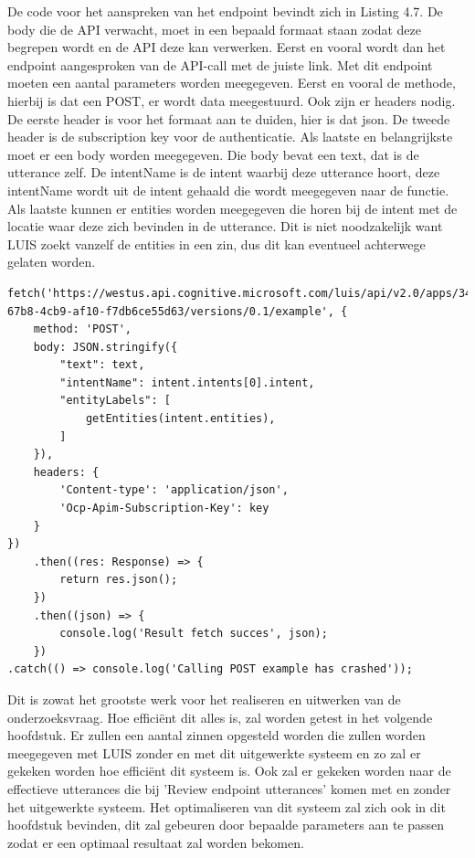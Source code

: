 De code voor het aanspreken van het endpoint bevindt zich in Listing 4.7. De body die de API verwacht, moet in een bepaald formaat staan zodat deze begrepen wordt en de API deze kan verwerken. Eerst en vooral wordt dan het endpoint aangesproken van de API-call met de juiste link. Met dit endpoint moeten een aantal parameters worden meegegeven. Eerst en vooral de methode, hierbij is dat een POST, er wordt data meegestuurd. Ook zijn er headers nodig. De eerste header is voor het formaat aan te duiden, hier is dat json. De tweede header is de subscription key voor de authenticatie. Als laatste en belangrijkste moet er een body worden meegegeven. Die body bevat een text, dat is de utterance zelf. De intentName is de intent waarbij deze utterance hoort, deze intentName wordt uit de intent gehaald die wordt meegegeven naar de functie. Als laatste kunnen er entities worden meegegeven die horen bij de intent met de locatie waar deze zich bevinden in de utterance. Dit is niet noodzakelijk want LUIS zoekt vanzelf de entities in een zin, dus dit kan eventueel achterwege gelaten worden.

\medskip
\begin{lstlisting}[caption=Toevoegen van een input aan LUIS van een API-call]
fetch('https://westus.api.cognitive.microsoft.com/luis/api/v2.0/apps/3480e277-67b8-4cb9-af10-f7db6ce55d63/versions/0.1/example', {
	method: 'POST',
	body: JSON.stringify({
		"text": text,
		"intentName": intent.intents[0].intent,
		"entityLabels": [
			getEntities(intent.entities),
		]
	}),
	headers: {
		'Content-type': 'application/json',
		'Ocp-Apim-Subscription-Key': key
	}
})
	.then((res: Response) => {
		return res.json();
	})
	.then((json) => {
		console.log('Result fetch succes', json);
	})
.catch(() => console.log('Calling POST example has crashed'));
\end{lstlisting}

Dit is zowat het grootste werk voor het realiseren en uitwerken van de onderzoeksvraag. Hoe efficiënt dit alles is, zal worden getest in het volgende hoofdstuk. Er zullen een aantal zinnen opgesteld worden die zullen worden meegegeven met LUIS zonder en met dit uitgewerkte systeem en zo zal er gekeken worden hoe efficiënt dit systeem is. Ook zal er gekeken worden naar de effectieve utterances die bij 'Review endpoint utterances' komen met en zonder het uitgewerkte systeem. Het optimaliseren van dit systeem zal zich ook in dit hoofdstuk bevinden, dit zal gebeuren door bepaalde parameters aan te passen zodat er een optimaal resultaat zal worden bekomen.

